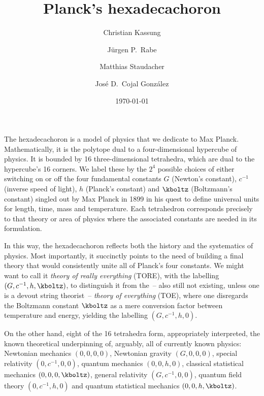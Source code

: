 \documentclass{scrartcl}
\title{Planck's hexadecachoron}
\author{Christian Kassung \and Jürgen P.\ Rabe \and Matthias Staudacher \and José D.\ Cojal González}
\date{\today}
\begin{document}
\maketitle

\setcounter{tocdepth}{1}


\newpage
\tableofcontents



\newpage {}          
\label{sec:intro}

The hexadecachoron is a model of physics that we dedicate to Max Planck. Mathematically, it is the polytope dual to a four-dimensional hypercube of physics. It is bounded by 16 three-dimensional tetrahedra, which are dual to the hypercube's 16 corners. We label these by the $2^4$ possible choices of either switching on or off the four fundamental constants $G$ (Newton's constant), $c^{−1}$ (inverse speed of light), $h$ (Planck's constant) and $\kboltz$ (Boltzmann's constant) singled out by Max Planck in 1899 in his quest to define universal units for length, time, mass and temperature. Each tetrahedron corresponds precisely to that theory or area of physics where the associated constants are needed in its formulation. 

In this way, the hexadecachoron reflects both the history and the systematics of physics. Most importantly, it succinctly points to the need of building a final theory that would consistently unite all of Planck's four constants. We might want to call it \textit{theory of really everything} (TORE), with the labelling $(G,c^{-1},h,\kboltz)$, to distinguish it from the~-- also still not existing, unless one is a devout string theorist~-- \textit{theory of everything} (TOE), where one disregards the Boltzmann constant $\kboltz$ as a mere conversion factor between temperature and energy, yielding the labelling $(G,c^{-1},h,0)$.

On the other hand, eight of the 16 tetrahedra form, appropriately interpreted, the known theoretical underpinning of, arguably, all of currently known physics: Newtonian mechanics $(0,0,0,0)$, Newtonian gravity $(G,0,0,0)$, special relativity $(0,c^{-1},0,0)$, quantum mechanics $(0,0,h,0)$, classical statistical mechanics $(0,0,0,\kboltz)$, general relativity $(G,c^{-1},0,0)$, quantum field theory $(0,c^{-1},h,0)$ and quantum statistical mechanics $(0,0,h,\kboltz)$.
\end{document}
